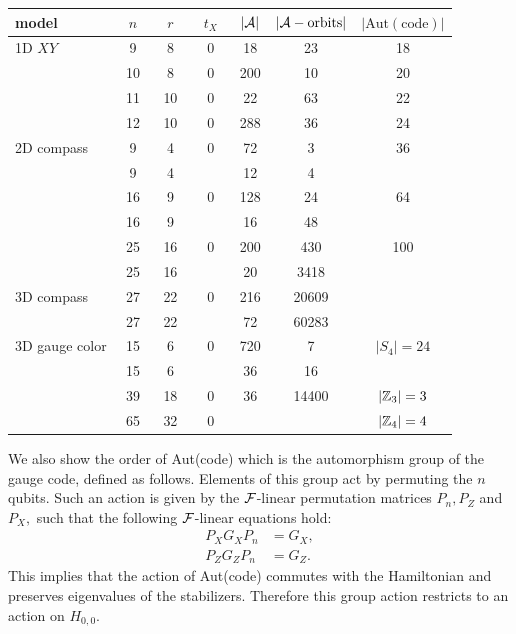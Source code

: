 \begin{center}
\begin{tabular}{ l|c|c|c|c|c|c } 
model &\ $n$\ &\ $r$\ &\ $t_X$\ & $|\mathcal{A}|$ & $|\mathcal{A}-\mathrm{orbits}|$ & 
$|\mathrm{Aut(code)}|$ \\
\hline
  1D $XY$ & 9 &  8& 0   & 18 & 23 & 18  \\
        & 10 & 8& 0   & 200 & 10 & 20  \\
        & 11 & 10 & 0 & 22 & 63 & 22  \\
        & 12 & 10 & 0 & 288 & 36 & 24  \\
\hline
    2D compass & 9 & 4 & 0 & 72 & 3 & 36 \\
            & 9 & 4 &    & 12 & 4 &  \\
            & 16 & 9  & 0 & 128 & 24 & 64 \\
            & 16 & 9  &    & 16 & 48 &  \\
            & 25 & 16 & 0 & 200 & 430 & 100 \\
            & 25 & 16 &    & 20  & 3418 &  \\
\hline
    3D compass & 27 & 22 & 0     & 216  & 20609  &     \\
               & 27 & 22 &    &  72 & 60283   &  \\
\hline
    3D gauge color & 15 & 6  & 0 & 720 & 7 & $|S_4|=24$ \\
                & 15 & 6  &  & 36 & 16 &  \\
                & 39 & 18 & 0 & 36 & 14400 & $|\mathbb{Z}_3|=3$  \\
                & 65 & 32 & 0 &    &       & $|\mathbb{Z}_4|=4$ \\
\end{tabular}
\end{center}

We also show the order of Aut(code) which is
the automorphism group of the gauge code, defined as follows.
Elements of this group act by permuting the $n$ qubits.
Such an action is given by the $\mathcal{F}$-linear
permutation matrices
$P_n, P_Z$ and $P_X,$ such that the following $\mathcal{F}$-linear equations hold:
\begin{align*}
    P_X G_X P_n &= G_X, \\
    P_Z G_Z P_n &= G_Z.
\end{align*}
This implies that the action of Aut(code)
commutes with the Hamiltonian and preserves eigenvalues of
the stabilizers. Therefore this group action restricts to an action
on $H_{0,0}.$

